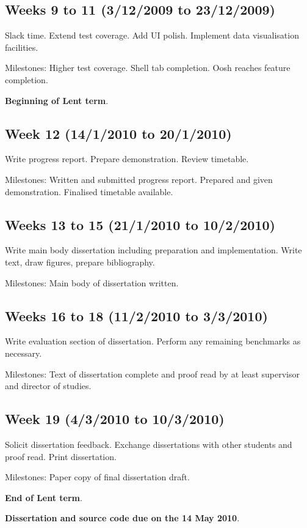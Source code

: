 \documentclass[12pt]{article}
\begin{document}
\subsection*{Weeks 9 to 11 (3/12/2009 to 23/12/2009)}
Slack time. Extend test coverage. Add UI polish. Implement data
visualisation facilities.

Milestones: Higher test coverage. Shell tab completion. Oosh reaches
feature completion.

{\bf Beginning of Lent term}.

\subsection*{Week 12 (14/1/2010 to 20/1/2010)}
Write progress report. Prepare demonstration. Review timetable.

Milestones: Written and submitted progress report. Prepared and given
demonstration. Finalised timetable available.

\subsection*{Weeks 13 to 15 (21/1/2010 to 10/2/2010)}
Write main body dissertation including preparation and
implementation. Write text, draw figures, prepare bibliography.

Milestones: Main body of dissertation written.

\subsection*{Weeks 16 to 18 (11/2/2010 to 3/3/2010)}
Write evaluation section of dissertation. Perform any remaining
benchmarks as necessary.

Milestones: Text of dissertation complete and proof read by at
least supervisor and director of studies.

\subsection*{Week 19 (4/3/2010 to 10/3/2010)}
Solicit dissertation feedback. Exchange dissertations with other
students and proof read. Print dissertation.

Milestones: Paper copy of final dissertation draft.

{\bf End of Lent term}.

{\bf Dissertation and source code due on the 14 May 2010}.
\end{document}
